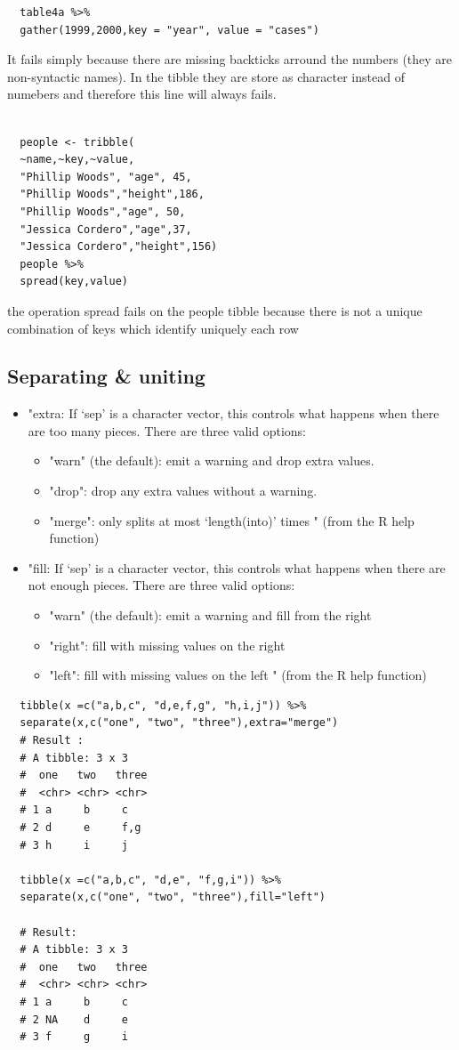 \documentclass[11pt]{article}
\begin{document}
\begin{verbatim}
  table4a %>%
  gather(1999,2000,key = "year", value = "cases")
\end{verbatim}
It fails simply because there are missing backticks arround the numbers (they are non-syntactic names).
In the tibble they are store as character instead of numebers and therefore this line will always fails.
\begin{verbatim}

  people <- tribble(
  ~name,~key,~value,
  "Phillip Woods", "age", 45,
  "Phillip Woods","height",186,
  "Phillip Woods","age", 50,
  "Jessica Cordero","age",37,
  "Jessica Cordero","height",156)
  people %>%
  spread(key,value)
\end{verbatim}

the operation spread fails on the people tibble because there is not a unique combination
of keys which identify uniquely each row
\subsection{Separating \& uniting}
\label{sec:org561b776}
\begin{itemize}
\item "extra: If ‘sep’ is a character vector, this controls what
  happens when there are too many pieces. There are three valid
  options:
  \begin{itemize}
  \item "warn" (the default): emit a warning and drop extra  values.
  \item "drop": drop any extra values without a warning.
  \item "merge": only splits at most ‘length(into)’ times " (from the R
    help function)
  \end{itemize}

\item "fill: If ‘sep’ is a character vector, this controls what
  happens when there are not enough pieces. There are three valid
  options:
  \begin{itemize}
  \item "warn" (the default): emit a warning and fill from the right
  \item "right": fill with missing values on the right
  \item "left": fill with missing values on the left " (from the R
    help function)
  \end{itemize}
\end{itemize}


\begin{verbatim}
  tibble(x =c("a,b,c", "d,e,f,g", "h,i,j")) %>%
  separate(x,c("one", "two", "three"),extra="merge")
  # Result :
  # A tibble: 3 x 3
  #  one   two   three
  #  <chr> <chr> <chr>
  # 1 a     b     c
  # 2 d     e     f,g
  # 3 h     i     j

  tibble(x =c("a,b,c", "d,e", "f,g,i")) %>%
  separate(x,c("one", "two", "three"),fill="left")

  # Result:
  # A tibble: 3 x 3
  #  one   two   three
  #  <chr> <chr> <chr>
  # 1 a     b     c
  # 2 NA    d     e
  # 3 f     g     i
\end{verbatim}
\end{document}
